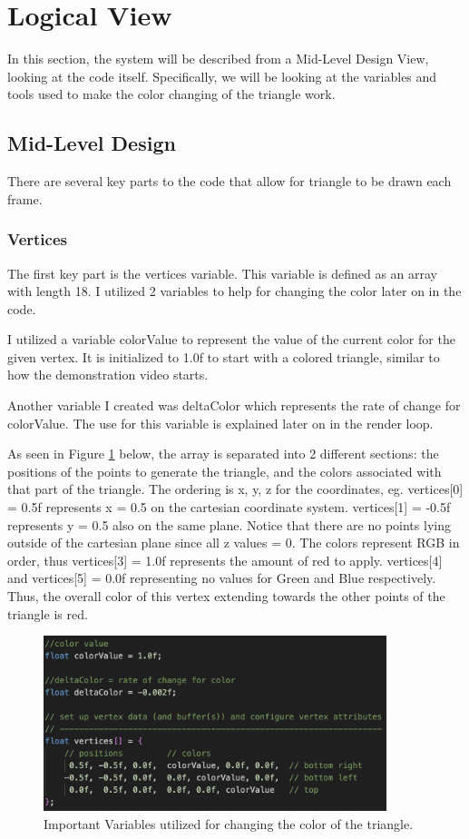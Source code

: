 \section{Logical View}
\label{section:logView}

In this section, the system will be described from a Mid-Level Design View, looking at the code itself.
Specifically, we will be looking at the variables and tools used to make the color changing of the triangle work.

\subsection{Mid-Level Design}

There are several key parts to the code that allow for triangle to be drawn each frame.

\subsubsection{Vertices}
The first key part is the vertices variable.
This variable is defined as an array with length 18.
I utilized 2 variables to help for changing the color later on in the code.

I utilized a variable colorValue to represent the value of the current color for the given vertex.
It is initialized to 1.0f to start with a colored triangle, similar to how the demonstration video starts.

Another variable I created was deltaColor which represents the rate of change for colorValue.
The use for this variable is explained later on in the render loop.

As seen in Figure \ref{Fig:vertices} below, the array is separated into 2 different sections: the positions of the points to generate the triangle, and the colors associated with that part of the triangle.
The ordering is x, y, z for the coordinates, eg. vertices[0] = 0.5f represents x = 0.5 on the cartesian coordinate system.
vertices[1] = -0.5f represents y = 0.5 also on the same plane.
Notice that there are no points lying outside of the cartesian plane since all z values = 0.
The colors represent RGB in order, thus vertices[3] = 1.0f represents the amount of red to apply.
vertices[4] and vertices[5] = 0.0f representing no values for Green and Blue respectively. 
Thus, the overall color of this vertex extending towards the other points of the triangle is red.

\begin{figure}[htb]
    \centering
    \includegraphics[width=10cm]{./Images/Vertices.png}
       \caption{Important Variables utilized for changing the color of the triangle.}
           \label{Fig:vertices}
\end{figure}

